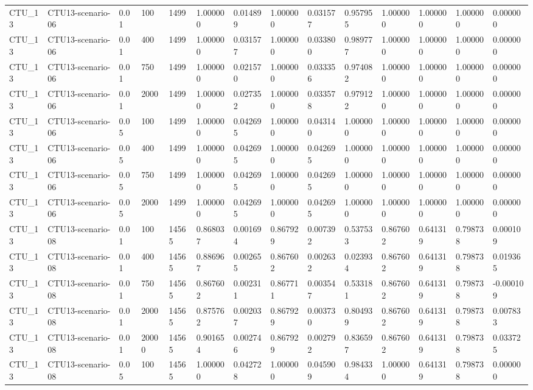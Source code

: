 \begin{tabular}{llllllllllllll}
CTU\_13 & CTU13-scenario-06 & 0.01 & 100 & 1499 & 1.000000 & 0.014899 & 1.000000 & 0.031577 & 0.957955 & 1.000000 & 1.000000 & 1.000000 & 0.000000 \\
CTU\_13 & CTU13-scenario-06 & 0.01 & 400 & 1499 & 1.000000 & 0.031577 & 1.000000 & 0.033800 & 0.989777 & 1.000000 & 1.000000 & 1.000000 & 0.000000 \\
CTU\_13 & CTU13-scenario-06 & 0.01 & 750 & 1499 & 1.000000 & 0.021570 & 1.000000 & 0.033356 & 0.974082 & 1.000000 & 1.000000 & 1.000000 & 0.000000 \\
CTU\_13 & CTU13-scenario-06 & 0.01 & 2000 & 1499 & 1.000000 & 0.027352 & 1.000000 & 0.033578 & 0.979122 & 1.000000 & 1.000000 & 1.000000 & 0.000000 \\
CTU\_13 & CTU13-scenario-06 & 0.05 & 100 & 1499 & 1.000000 & 0.042695 & 1.000000 & 0.043140 & 1.000000 & 1.000000 & 1.000000 & 1.000000 & 0.000000 \\
CTU\_13 & CTU13-scenario-06 & 0.05 & 400 & 1499 & 1.000000 & 0.042695 & 1.000000 & 0.042695 & 1.000000 & 1.000000 & 1.000000 & 1.000000 & 0.000000 \\
CTU\_13 & CTU13-scenario-06 & 0.05 & 750 & 1499 & 1.000000 & 0.042695 & 1.000000 & 0.042695 & 1.000000 & 1.000000 & 1.000000 & 1.000000 & 0.000000 \\
CTU\_13 & CTU13-scenario-06 & 0.05 & 2000 & 1499 & 1.000000 & 0.042695 & 1.000000 & 0.042695 & 1.000000 & 1.000000 & 1.000000 & 1.000000 & 0.000000 \\
CTU\_13 & CTU13-scenario-08 & 0.01 & 100 & 14565 & 0.868037 & 0.001694 & 0.867929 & 0.007392 & 0.537533 & 0.867602 & 0.641319 & 0.798738 & 0.000109 \\
CTU\_13 & CTU13-scenario-08 & 0.01 & 400 & 14565 & 0.886967 & 0.002655 & 0.867602 & 0.002632 & 0.023934 & 0.867602 & 0.641319 & 0.798738 & 0.019365 \\
CTU\_13 & CTU13-scenario-08 & 0.01 & 750 & 14565 & 0.867602 & 0.002311 & 0.867711 & 0.003547 & 0.533181 & 0.867602 & 0.641319 & 0.798738 & -0.000109 \\
CTU\_13 & CTU13-scenario-08 & 0.01 & 2000 & 14565 & 0.875762 & 0.002037 & 0.867929 & 0.003730 & 0.804939 & 0.867602 & 0.641319 & 0.798738 & 0.007833 \\
CTU\_13 & CTU13-scenario-08 & 0.01 & 20000 & 14565 & 0.901654 & 0.002746 & 0.867929 & 0.002792 & 0.836597 & 0.867602 & 0.641319 & 0.798738 & 0.033725 \\
CTU\_13 & CTU13-scenario-08 & 0.05 & 100 & 14565 & 1.000000 & 0.042728 & 1.000000 & 0.045909 & 0.984334 & 1.000000 & 0.641319 & 0.798738 & 0.000000 \\

\end{tabular}
